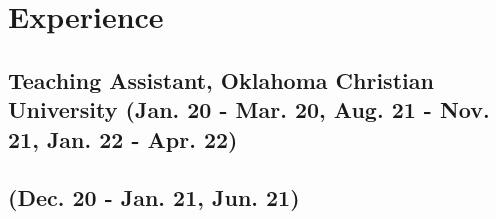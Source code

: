 \documentclass{article}
\begin{document}
\begin{comment}
		\subsection{Spring 2020}
			\begin{itemize}
				\item ENGR-2614 Electrical Circuit Analysis
				\item ENGR-2123 ECE Mathematics II
			\end{itemize}
		\subsection{Fall 2019}
			\begin{itemize}
				\item ENGR-2544 Introductory Digital Systems Design
				\item CMSC-2133 Object Oriented Programming
			\end{itemize}
		\subsection{Spring 2019}
			\begin{itemize}
				\item ENGR-2113 ECE Mathematics I
				\item ENGR-1242 Engineering Fundamentals
				\item CMSC-1123 Programming II
			\end{itemize}
		\subsection{Fall 2018}
			\begin{itemize}
				\item CMSC-1113 Programming I
				\item ENGR-1122 Engineering Computing
			\end{itemize}
\end{comment}

\section{Experience}
	\subsection{Teaching Assistant, Oklahoma Christian University (Jan. 20 - Mar. 20, Aug. 21 - Nov. 21, Jan. 22 - Apr. 22)}
	\subsection{(Dec. 20 - Jan. 21, Jun. 21)}
\end{document}
